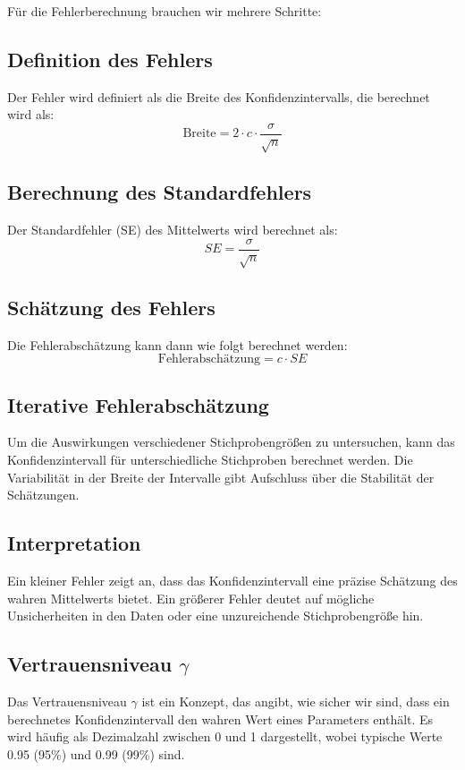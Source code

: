 Für die Fehlerberechnung brauchen wir mehrere Schritte:
\subsection*{Definition des Fehlers}
Der Fehler wird definiert als die Breite des Konfidenzintervalls, die berechnet wird als:
\[
\text{Breite} = 2 \cdot c \cdot \frac{\sigma}{\sqrt{n}}
\]

\subsection*{Berechnung des Standardfehlers}
Der Standardfehler (SE) des Mittelwerts wird berechnet als:
\[
SE = \frac{\sigma}{\sqrt{n}}
\]

\subsection*{Schätzung des Fehlers}
Die Fehlerabschätzung kann dann wie folgt berechnet werden:
\[
\text{Fehlerabschätzung} = c \cdot SE
\]

\subsection*{Iterative Fehlerabschätzung}
Um die Auswirkungen verschiedener Stichprobengrößen zu untersuchen, kann das Konfidenzintervall für unterschiedliche Stichproben berechnet werden. Die Variabilität in der Breite der Intervalle gibt Aufschluss über die Stabilität der Schätzungen.

\subsection*{Interpretation}
Ein kleiner Fehler zeigt an, dass das Konfidenzintervall eine präzise Schätzung des wahren Mittelwerts bietet. Ein größerer Fehler deutet auf mögliche Unsicherheiten in den Daten oder eine unzureichende Stichprobengröße hin.


\subsection{Vertrauensniveau $\gamma$}
\label{sec:vertrauensniveau}
Das Vertrauensniveau \(\gamma\) ist ein Konzept, das angibt, wie sicher wir sind, dass ein berechnetes Konfidenzintervall den wahren Wert eines Parameters enthält. Es wird häufig als Dezimalzahl zwischen 0 und 1 dargestellt, wobei typische Werte 0.95 (95\%) und 0.99 (99\%) sind.

